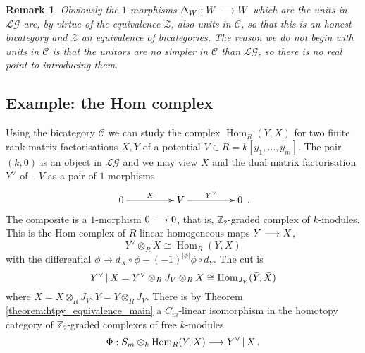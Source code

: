 \documentclass[english,letter paper,12pt,leqno]{article}
\theoremstyle{example}
\newtheorem{remark}[theorem]{Remark}
\numberwithin{equation}{section}
\def\im{\operatorname{Im}}
\def\LG{\mathcal{LG}}
\def\Hom{\operatorname{Hom}}
\def\be{\begin{equation}}
\def\ee{\end{equation}}
\def\L{\mathcal{C}}
\begin{document}
\begin{remark} Obviously the $1$-morphisms $\Delta_W: W \longrightarrow W$ which are the units in $\LG$ are, by virtue of the equivalence $\mathcal{Z}$, also units in $\L$, so that this is an honest bicategory and $\mathcal{Z}$ an equivalence of bicategories. The reason we do not begin with units in $\L$ is that the unitors are no simpler in $\L$ than $\LG$, so there is no real point to introducing them.
\end{remark}

\subsection{Example: the Hom complex}\label{example:computing_homs}

Using the bicategory $\L$ we can study the complex $\Hom_R(Y,X)$ for two finite rank matrix factorisations $X,Y$ of a potential $V \in R = k[y_1,\ldots,y_m]$. The pair $(k,0)$ is an object in $\LG$ and we may view $X$ and the dual matrix factorisation $Y^{\vee}$ of $-V$ as a pair of $1$-morphisms
\begin{equation}\label{eq:compute_hom_composition}
\xymatrix@C+2pc{
0 \ar[r]^-{X} & V \ar[r]^-{Y^{\vee}} & 0
}\,.
\end{equation}
The composite is a $1$-morphism $0 \longrightarrow 0$, that is, $\mathbb{Z}_2$-graded complex of $k$-modules. This is the Hom complex of $R$-linear homogeneous maps $Y \longrightarrow X$,
\[
Y^{\vee} \otimes_R X \cong \Hom_R(Y, X)
\]
with the differential $\phi \mapsto d_X \circ \phi - (-1)^{|\phi|} \phi \circ d_Y$. The cut is
\[
Y^{\vee} \l X = Y^{\vee} \otimes_R J_V \otimes_R X \cong \Hom_{J_V}( \bar{Y}, \bar{X} )
\]
where $\bar{X} = X \otimes_R J_V, \bar{Y} = Y \otimes_R J_V$. There is by Theorem \ref{theorem:htpy_equivalence_main} a $C_m$-linear isomorphism in the homotopy category of $\mathbb{Z}_2$-graded complexes of free $k$-modules
\be
\Phi: S_m \otimes_k \Hom_R(Y,X) \lto Y^{\vee} \l X\,.
\ee
\end{document}
